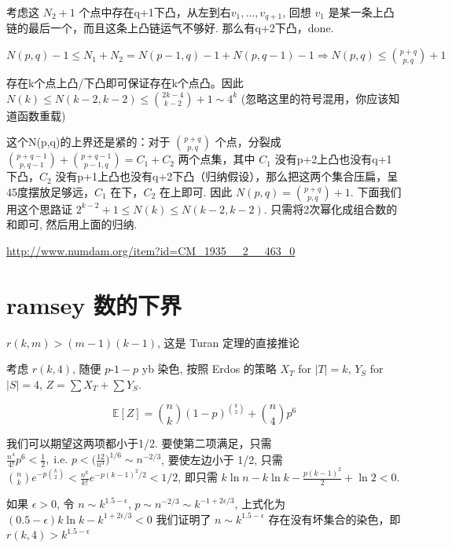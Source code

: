 考虑这 $N_2+1$ 个点中存在q+1下凸，从左到右$v_1,\dots,v_{q+1}$, 回想 $v_1$ 是某一条上凸链的最后一个，而且这条上凸链运气不够好. 那么有q+2下凸，done.


$N(p,q)-1\leq N_1+N_2=N(p-1,q)-1+N(p,q-1)-1\Rightarrow N(p,q)\leq{p+q\choose p,q}+1$

存在k个点上凸/下凸即可保证存在k个点凸。因此 $N(k)\leq N(k-2,k-2)\leq{2k-4\choose k-2}+1\sim 4^k$ (忽略这里的符号混用，你应该知道函数重载)

这个N(p,q)的上界还是紧的：对于 ${p+q\choose p,q}$ 个点，分裂成 ${p+q-1\choose p,q-1}+{p+q-1\choose p-1,q}=C_1+C_2$ 两个点集，其中 $C_1$ 没有p+2上凸也没有q+1下凸，$C_2$ 没有p+1上凸也没有q+2下凸（归纳假设），那么把这两个集合压扁，呈45度摆放足够远，$C_1$ 在下，$C_2$ 在上即可. 因此 $N(p,q)={p+q\choose p,q}+1$. 下面我们用这个思路证 $2^{k-2}+1\leq N(k)\leq N(k-2,k-2)$. 只需将2次幂化成组合数的和即可, 然后用上面的归纳.



\url{http://www.numdam.org/item?id=CM_1935__2__463_0}

\section{ramsey 数的下界}

$r(k,m)> (m-1)(k-1)$, 这是 Turan 定理的直接推论

考虑 $r(k,4)$, 随便 $p$-$1-p$ yb 染色, 按照 Erdos 的策略 $X_T$ for $|T|=k$, $Y_S$ for $|S|=4$, $Z=\sum X_T+\sum Y_S$.

\[
\mathbb{E}[Z]={n\choose k}(1-p)^{{k\choose 2}}+{n\choose 4}p^{6}
\]

我们可以期望这两项都小于1/2. 要使第二项满足，只需 $\frac{n^4}{4!}p^6<\frac{1}{2},\;\text{i.e. }p<\Big(\frac{12}{n^4}\Big)^{1/6}\sim n^{-2/3}$, 要使左边小于 1/2, 只需 ${n\choose k}e^{-p{k\choose 2}}<\frac{n^k}{k!}e^{-p(k-1)^2/2}<1/2$, 即只需 $k\ln n-k\ln k-\frac{p(k-1)^2}{2}+\ln 2<0$.

如果 $\epsilon>0$, 令 $n\sim k^{1.5-\epsilon}$, $p\sim n^{-2/3}\sim k^{-1+2\epsilon/3}$, 上式化为 $(0.5-\epsilon)k\ln k-k^{1+2\epsilon/3}<0$ 我们证明了 $n\sim k^{1.5-\epsilon}$ 存在没有坏集合的染色，即 $r(k,4)>k^{1.5-\epsilon}$
